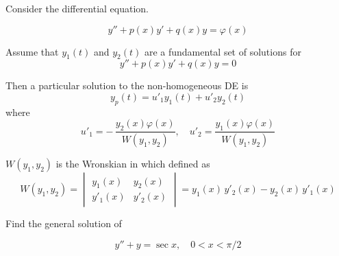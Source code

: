 \begin{theorem}
    Consider the differential equation. 

    \begin{equation}
        y'' + p(x)y' + q(x)y = \varphi(x)
    \end{equation}

    Assume that $y_1(t)$ and $y_2(t)$ are a fundamental set of solutions for 
    \begin{equation}
        y'' + p(x)y' + q(x)y = 0
    \end{equation}

    Then a particular solution to the non-homogeneous DE is
    \begin{equation}
        y_p(t) = u'_1 y_1(t) + u'_2 y_2(t)
    \end{equation}
    where 
    \begin{equation}
        u'_1 = -\,\frac{y_2(x) \varphi(x)}{W(y_1, y_2)}, \quad
        u'_2 = \frac{y_1(x) \varphi(x)}{W(y_1, y_2)} 
    \end{equation}

    $W(y_1, y_2)$ is the Wronskian in which defined as 
    \begin{equation}
        W(y_1, y_2) = \begin{vmatrix}
            y_1(x) & y_2(x)\\
            y'_1(x) & y'_2(x)
        \end{vmatrix} = y_1(x)\,y'_2(x) - y_2(x)\,y'_1(x)
    \end{equation}
\end{theorem}

\begin{example}
    Find the general solution of 

    \[
        y'' + y = \sec x, \quad 0 < x < \pi/2
    \]
\end{example}

